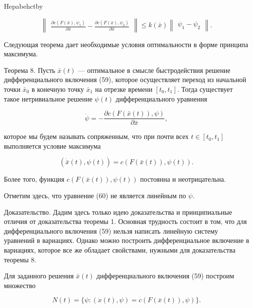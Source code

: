 \documentclass[10pt]{article}
\begin{document}
Hepabehctby

\[
\left\lVert \begin{array}{c} {\frac{\partial c\left( {F\left( \bar{x}\right),{\psi }_{1}}\right) }{\partial \bar{x}} - \frac{\partial c\left( {F\left( \bar{x}\right),{\psi }_{2}}\right) }{\partial \bar{x}}} \end{array} \right\rVert \leq  k\left( \bar{x}\right) \left\lVert \begin{array}{c} {{\psi }_{1} - {\psi }_{2}} \end{array} \right\rVert.
\]

Следующая теорема дает необходимые условия оптимальности в форме принципа максимума.

Теорема 8. Пусть \(\bar{x}\left( t\right)\) — оптимальное в смысле быстродействия решение дифференциального включения (59), которое осуществляет переход из начальной точки \({\bar{x}}_{0}\) в конечную точку \({\bar{x}}_{1}\) на отрезке времени \(\left\lbrack  {{t}_{0},{t}_{1}}\right\rbrack\). Тогда существует такое нетривиальное решение \(\psi \left( t\right)\) дифференциального уравнения

\[
\dot{\psi } =  - \frac{\partial c\left( {F\left( {\bar{x}\left( t\right) }\right),\psi }\right) }{\partial \bar{x}}, \tag{60}
\]

которое мы будем называть сопряженным, что при почти всех \(t \in \left\lbrack  {{t}_{0},{t}_{1}}\right\rbrack\) выполняется условие максимума

\[
\left( {\dot{\bar{x}}\left( t\right),\psi \left( t\right) }\right)  = c\left( {F\left( {\bar{x}\left( t\right) }\right),\psi \left( t\right) }\right). \tag{61}
\]

Более того, функция \(c\left( {F\left( {\bar{x}\left( t\right) }\right),\psi \left( t\right) }\right)\) постоянна и неотрицательна.

Отметим здесь, что уравнение (60) не является линейным по \(\psi\).

Доказательство. Дадим здесь только идею доказательства и принципиальные отличия от доказательства теоремы 1. Основная трудность состоит в том, что для дифференциального включения (59) нельзя написать линейную систему уравнений в вариациях. Однако можно построить дифференциальное включение в вариациях, которое все же обладает свойствами, нужными для доказательства теоремы 8.

Для заданного решения \(\bar{x}\left( t\right)\) дифференциального включения (59) построим множество

\[
N\left( t\right)  = \{ \psi  : \left( {\dot{x}\left( t\right),\psi }\right)  = c\left( {F\left( {\bar{x}\left( t\right) }\right),\psi }\right) \}.
\]
\end{document}
